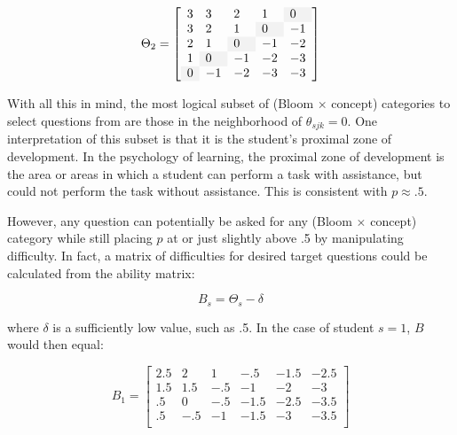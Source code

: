 \begin{equation}
\label{eq:perfect}
\Theta_2 =\left[
         \begin{array}{llllll}
             3   & 3   & 2   &  1 & \y0\\
             3   & 2   & 1   &\y0 & -1 \\
             2   & 1   & \y0 & -1 & -2 \\
             1   & \y0 & -1  & -2 & -3 \\
             \y0 & -1  & -2  & -3 & -3 \\
         \end{array}
       \right]
\end{equation}
\vspace{12pt}

With all this in mind, the most logical subset of (Bloom $\times$ concept)
categories to select questions from are those in the neighborhood of
$\theta_{sjk} = 0$.  One interpretation of this subset is that it is the
student's proximal zone of development.  In the psychology of learning, the
proximal zone of development is the area or areas in which a student can
perform a task with assistance, but could not perform the task without
assistance.  This is consistent with $p \approx .5$.

However, any question can potentially be asked for any (Bloom $\times$ concept)
category while still placing $p$ at or just slightly above .5 by manipulating
difficulty.  In fact, a matrix of difficulties for desired target questions
could be calculated from the ability matrix:

\begin{equation}
  B_s = \Theta_s - \delta
\end{equation}

where $\delta$ is a sufficiently low value, such as .5.  In the case of
student $s=1$, $B$ would then equal:

\begin{equation}
B_1 =\left[
         \begin{array}{llllll}
             2.5 & 2    & 1   & -.5  & -1.5   & -2.5 \\
             1.5 & 1.5  & -.5 & -1   & -2     & -3   \\
             .5  &  0   & -.5 & -1.5 & -2.5   & -3.5 \\
             .5  & -.5  & -1  & -1.5 & -3     & -3.5 \\
         \end{array}
       \right]
\end{equation}
\vspace{12pt}

